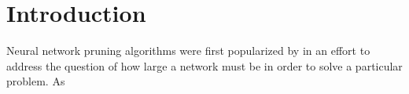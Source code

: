 \section{Introduction}
Neural network pruning algorithms were first popularized by \cite{sietsma1988neural} in an effort to address the question of how large a network must be in order to solve a particular problem. As \cite{baum1989size}